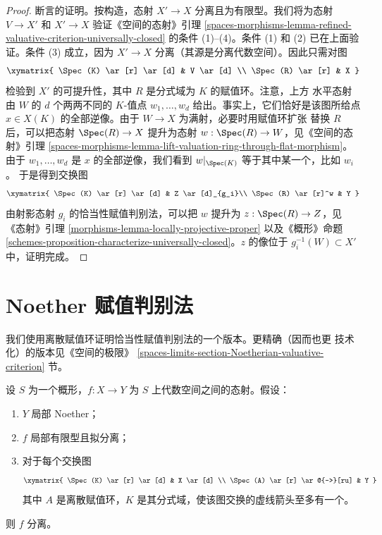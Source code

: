 \begin{proof}
\medskip\noindent
断言的证明。按构造，态射 $X' \to X$ 分离且为有限型。我们将为态射
$V \to X'$ 和 $X' \to X$ 验证《空间的态射》引理
\ref{spaces-morphisms-lemma-refined-valuative-criterion-universally-closed}
的条件 (1)--(4)。条件 (1) 和 (2) 已在上面验证。条件 (3) 成立，因为
$X' \to X$ 分离（其源是分离代数空间）。因此只需对图
$$
\xymatrix{
\Spec(K) \ar[r] \ar[d] & V \ar[d] \\
\Spec(R) \ar[r] & X
}
$$
检验到 $X'$ 的可提升性，其中 $R$ 是分式域为 $K$ 的赋值环。注意，上方
水平态射由 $W$ 的 $d$ 个两两不同的 $K$-值点
$w_1, \ldots, w_d$ 给出。事实上，它们恰好是该图所给点
$x \in X(K)$ 的全部逆像。由于 $W \to X$ 为满射，必要时用赋值环扩张
替换 $R$ 后，可以把态射 $\Spec(R) \to X$ 提升为态射
$w : \Spec(R) \to W$，见《空间的态射》引理
\ref{spaces-morphisms-lemma-lift-valuation-ring-through-flat-morphism}。
由于 $w_1, \ldots, w_d$ 是 $x$ 的全部逆像，我们看到
$w|_{\Spec(K)}$ 等于其中某一个，比如 $w_i$。%
于是得到交换图
$$
\xymatrix{
\Spec(K) \ar[r] \ar[d] &  Z \ar[d]_{g_i}\\
\Spec(R) \ar[r]^w & Y
}
$$
由射影态射 $g_i$ 的恰当性赋值判别法，可以把 $w$ 提升为
$z : \Spec(R) \to Z$，见《态射》引理
\ref{morphisms-lemma-locally-projective-proper} 以及《概形》命题
\ref{schemes-proposition-characterize-universally-closed}。$z$ 的像位于
$g_i^{-1}(W) \subset X'$ 中，证明完成。
\end{proof}







\section{Noether 赋值判别法}
\label{section-Noetherian-valuative-criterion}

\noindent
我们使用离散赋值环证明恰当性赋值判别法的一个版本。更精确（因而也更
技术化）的版本见《空间的极限》
\ref{spaces-limits-section-Noetherian-valuative-criterion} 节。

\begin{lemma}
\label{lemma-check-separated-dvr}
设 $S$ 为一个概形，$f : X \to Y$ 为 $S$ 上代数空间之间的态射。假设：
\begin{enumerate}
\item $Y$ 局部 Noether；
\item $f$ 局部有限型且拟分离；
\item 对于每个交换图
$$
\xymatrix{
\Spec(K) \ar[r] \ar[d] & X \ar[d] \\
\Spec(A) \ar[r] \ar@{-->}[ru] & Y
}
$$
其中 $A$ 是离散赋值环，$K$ 是其分式域，使该图交换的虚线箭头至多有一个。
\end{enumerate}
则 $f$ 分离。
\end{lemma}

